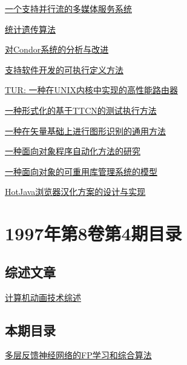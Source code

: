 \documentclass[a4paper]{article}
\begin{document}
\href{http://www.jos.org.cn/ch/reader/download_pdf.aspx?file_no=19970502&year_id=1997&quarter_id=5&falg=1}{一个支持并行流的多媒体服务系统}

\href{http://www.jos.org.cn/ch/reader/download_pdf.aspx?file_no=19970503&year_id=1997&quarter_id=5&falg=1}{统计遗传算法}

\href{http://www.jos.org.cn/ch/reader/download_pdf.aspx?file_no=19970504&year_id=1997&quarter_id=5&falg=1}{对Condor系统的分析与改进}

\href{http://www.jos.org.cn/ch/reader/download_pdf.aspx?file_no=19970505&year_id=1997&quarter_id=5&falg=1}{支持软件开发的可执行定义方法}

\href{http://www.jos.org.cn/ch/reader/download_pdf.aspx?file_no=19970506&year_id=1997&quarter_id=5&falg=1}{TUR: 一种在UNIX内核中实现的高性能路由器}

\href{http://www.jos.org.cn/ch/reader/download_pdf.aspx?file_no=19970507&year_id=1997&quarter_id=5&falg=1}{一种形式化的基于TTCN的测试执行方法}

\href{http://www.jos.org.cn/ch/reader/download_pdf.aspx?file_no=19970508&year_id=1997&quarter_id=5&falg=1}{一种在矢量基础上进行图形识别的通用方法}

\href{http://www.jos.org.cn/ch/reader/download_pdf.aspx?file_no=19970509&year_id=1997&quarter_id=5&falg=1}{一种面向对象程序自动化方法的研究}

\href{http://www.jos.org.cn/ch/reader/download_pdf.aspx?file_no=19970510&year_id=1997&quarter_id=5&falg=1}{一种面向对象的可重用库管理系统的模型}

\href{http://www.jos.org.cn/ch/reader/download_pdf.aspx?file_no=19970511&year_id=1997&quarter_id=5&falg=1}{HotJava浏览器汉化方案的设计与实现}


\section{\textbf{1997年第8卷第4期目录}}
\subsection{综述文章}
\href{http://www.jos.org.cn/ch/reader/download_pdf.aspx?file_no=19970401&year_id=1997&quarter_id=4&falg=1}{计算机动画技术综述}

\subsection{本期目录}
\href{http://www.jos.org.cn/ch/reader/download_pdf.aspx?file_no=19970402&year_id=1997&quarter_id=4&falg=1}{多层反馈神经网络的FP学习和综合算法}
\end{document}
